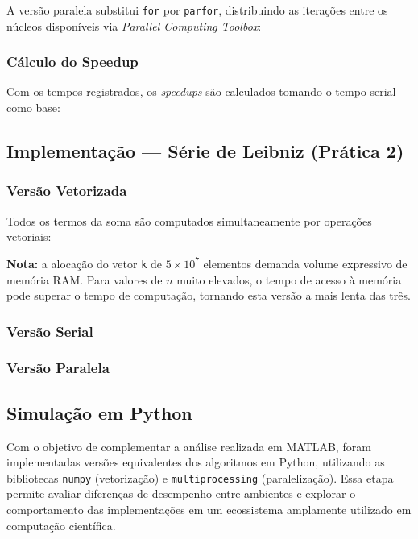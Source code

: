 \documentclass[12pt, a4paper]{article}
\begin{document}
	A versão paralela substitui \texttt{for} por \texttt{parfor}, distribuindo as
	iterações entre os núcleos disponíveis via \textit{Parallel Computing Toolbox}:
	
	
	
	\subsubsection{Cálculo do Speedup}
	
	Com os tempos registrados, os \textit{speedups} são calculados tomando o tempo
	serial como base:
	
	
	\subsection{Implementação — Série de Leibniz (Prática 2)}
	
	\subsubsection{Versão Vetorizada}
	
	Todos os termos da soma são computados simultaneamente por operações vetoriais:

	
	\noindent \textbf{Nota:} a alocação do vetor \texttt{k} de $5 \times 10^7$
	elementos demanda volume expressivo de memória RAM. Para valores de $n$ muito
	elevados, o tempo de acesso à memória pode superar o tempo de computação,
	tornando esta versão a mais lenta das três.
	
	\subsubsection{Versão Serial}
	
	
	
	\subsubsection{Versão Paralela}
	
	
	\subsection{Simulação em Python}
	\label{subsec:python}
	
	Com o objetivo de complementar a análise realizada em MATLAB, foram
	implementadas versões equivalentes dos algoritmos em Python, utilizando
	as bibliotecas \texttt{numpy} (vetorização) e \texttt{multiprocessing}
	(paralelização). Essa etapa permite avaliar diferenças de desempenho
	entre ambientes e explorar o comportamento das implementações em um
	ecossistema amplamente utilizado em computação científica.
	
\end{document}
